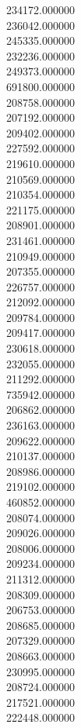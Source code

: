 234172.000000\\
236042.000000\\
245335.000000\\
232236.000000\\
249373.000000\\
691800.000000\\
208758.000000\\
207192.000000\\
209402.000000\\
227592.000000\\
219610.000000\\
210569.000000\\
210354.000000\\
221175.000000\\
208901.000000\\
231461.000000\\
210949.000000\\
207355.000000\\
226757.000000\\
212092.000000\\
209784.000000\\
209417.000000\\
230618.000000\\
232055.000000\\
211292.000000\\
735942.000000\\
206862.000000\\
236163.000000\\
209622.000000\\
210137.000000\\
208986.000000\\
219102.000000\\
460852.000000\\
208074.000000\\
209026.000000\\
208006.000000\\
209234.000000\\
211312.000000\\
208309.000000\\
206753.000000\\
208685.000000\\
207329.000000\\
208663.000000\\
230995.000000\\
208724.000000\\
217521.000000\\
222448.000000\\
